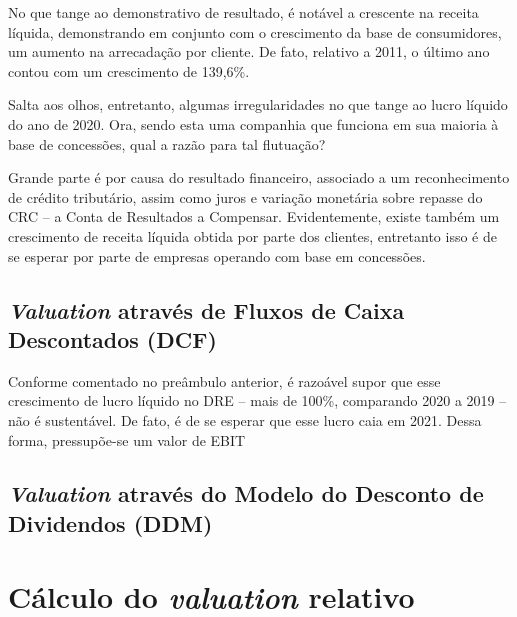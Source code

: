 \documentclass[grad,numbers]{coppe}
\begin{document}
  No que tange ao demonstrativo de resultado, é notável a crescente na receita líquida, demonstrando em conjunto com o crescimento da base de consumidores, um aumento na arrecadação por cliente. De fato, relativo a 2011, o último ano contou com um crescimento de 139,6\%.

  Salta aos olhos, entretanto, algumas irregularidades no que tange ao lucro líquido do ano de 2020. Ora, sendo esta uma companhia que funciona em sua maioria à base de concessões, qual a razão para tal flutuação?

  Grande parte é por causa do resultado financeiro, associado a um reconhecimento de crédito tributário, assim como juros e variação monetária sobre repasse do CRC -- a Conta de Resultados a Compensar. Evidentemente, existe também um crescimento de receita líquida obtida por parte dos clientes, entretanto isso é de se esperar por parte de empresas operando com base em concessões.

  \hypertarget{valuation-atravuxe9s-de-fluxos-de-caixa-descontados-dcf}{%
  \subsection{\texorpdfstring{\emph{Valuation} através de Fluxos de Caixa Descontados (DCF)}{Valuation através de Fluxos de Caixa Descontados (DCF)}}\label{valuation-atravuxe9s-de-fluxos-de-caixa-descontados-dcf}}

  Conforme comentado no preâmbulo anterior, é razoável supor que esse crescimento de lucro líquido no DRE -- mais de 100\%, comparando 2020 a 2019 -- não é sustentável. De fato, é de se esperar que esse lucro caia em 2021. Dessa forma, pressupõe-se um valor de EBIT

  \hypertarget{valuation-atravuxe9s-do-modelo-do-desconto-de-dividendos-ddm}{%
  \subsection{\texorpdfstring{\emph{Valuation} através do Modelo do Desconto de Dividendos (DDM)}{Valuation através do Modelo do Desconto de Dividendos (DDM)}}\label{valuation-atravuxe9s-do-modelo-do-desconto-de-dividendos-ddm}}

  \hypertarget{cuxe1lculo-do-valuation-relativo}{%
  \section{\texorpdfstring{Cálculo do \emph{valuation} relativo}{Cálculo do valuation relativo}}\label{cuxe1lculo-do-valuation-relativo}}
\end{document}
